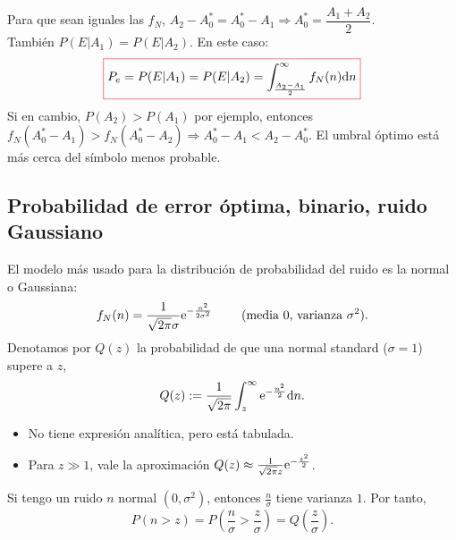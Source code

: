 \begin{figure}[htb]
    \centering\begin{minipage}{\textwidth}
    \endpgfgraphicnamed\end{minipage}
\end{figure}

Para que sean iguales las $f_N$, $A_2-A_0^* = A_0^*-A_1
\Rightarrow A_0^*=\dfrac{A_1+A_2}{2}$. \\
También $P(E|A_1) =
P(E|A_2)$. En este caso:
\[
{\col{P_e= P(E|A_1) = P(E|A_2) = \int_{\frac{A_2-A_1}{2}}^\infty
f_N(n)\d n}}
\]
Si en cambio, $P(A_2) > P(A_1)$ por ejemplo, entonces
$f_N(A_0^*-A_1) > f_N(A_0^*-A_2) \Rightarrow A_0^*-A_1 <
A_2-A_0^*$. El umbral óptimo está más cerca del símbolo menos
probable.

\subsection*{Probabilidad de error óptima, binario, ruido Gaussiano}
El modelo más usado para la distribución de probabilidad del ruido
es la normal o Gaussiana:
\[f_N(n) = \frac{1}{\sqrt{2\pi}\sigma}\mathrm{e}^{-\frac{n^2}{2\sigma^2}}\qquad \text{ (media $0$, varianza $\sigma^2$)}.\]
Denotamos por $Q(z)$ la probabilidad de que una normal standard
($\sigma=1$) supere a $z$,
\[Q(z):=\frac{1}{\sqrt{2\pi}} \int_z^\infty \mathrm{e}^{-\frac{n^2}{2}}\mathrm{d} n.\]
\begin{itemize}
    \item No tiene expresión analítica, pero está tabulada.
    \item Para $z \gg 1$, vale la aproximación $Q(z)\approx
    \frac{1}{\sqrt{2\pi}z}\mathrm{e}^{-\frac{z^2}{2}}$.
\end{itemize}

Si tengo un ruido $n$ normal $(0,\sigma^2)$, entonces $\frac{n}{\sigma}$ tiene varianza $1$. Por tanto,
\[P(n>z) = P \left(\frac{n}{\sigma}>\frac{z}{\sigma}\right) = Q\left(\frac{z}{\sigma}\right).\]

